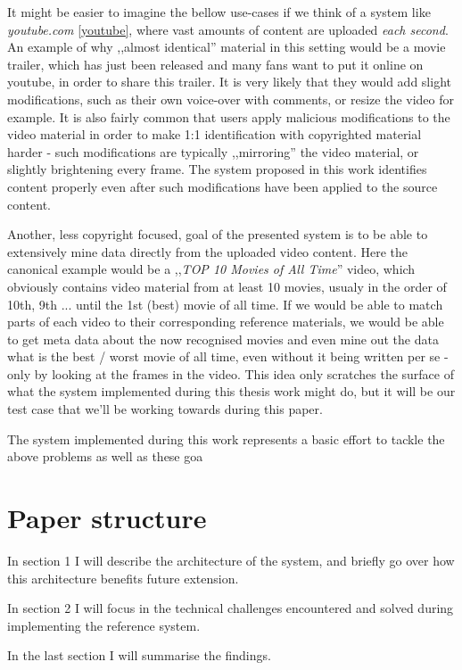 It might be easier to imagine the bellow use-cases if we think of a system like \textit{youtube.com} \ref{youtube}, where vast amounts of content are uploaded \textit{each second}. An example of why ,,almost identical'' material in this setting would be a movie trailer, which has just been released and many fans want to put it online on youtube, in order to share this trailer. It is very likely that they would add slight modifications, such as their own voice-over with comments, or resize the video for example. It is also fairly common that users apply malicious modifications to the video material in order to make 1:1 identification with copyrighted material harder - such modifications are typically ,,mirroring'' the video material, or slightly brightening every frame. The system proposed in this work identifies content properly even after such modifications have been applied to the source content.

Another, less copyright focused, goal of the presented system is to be able to extensively mine data directly from the uploaded video content.
Here the canonical example would be a ,,\textit{TOP 10 Movies of All Time}'' video, which obviously contains video material from at least 10 movies,
usualy in the order of 10th, 9th ... until the 1st (best) movie of all time. If we would be able to match parts of each video to their corresponding 
reference materials, we would be able to get meta data about the now recognised movies and even mine out the data what is the best / worst movie of all time,
even without it being written per se - only by looking at the frames in the video. This idea only scratches the surface of what the system implemented during
this thesis work might do, but it will be our test case that we'll be working towards during this paper.

The system implemented during this work represents a basic effort to tackle the above problems as well as these goa

\section{Paper structure}
In section 1 I will describe the architecture of the system, and briefly go over how this architecture benefits future extension.

In section 2 I will focus in the technical challenges encountered and solved during implementing the reference system.

In the last section I will summarise the findings.

